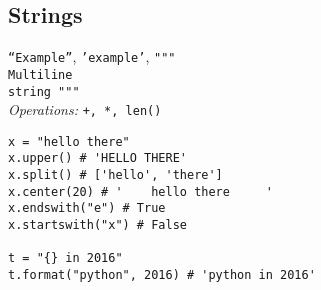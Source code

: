 \subsection{Strings}
\texttt{``Example''}, \texttt{'example'}, \texttt{""" \\
Multiline \\
string """}\\
\textit{Operations:} \texttt{+, *, len()}
\begin{lstlisting}
x = "hello there"
x.upper() # 'HELLO THERE'
x.split() # ['hello', 'there']
x.center(20) # '    hello there     '
x.endswith("e") # True
x.startswith("x") # False

t = "{} in 2016"
t.format("python", 2016) # 'python in 2016'
\end{lstlisting}
